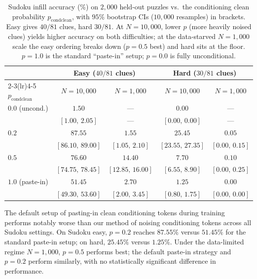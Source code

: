 \documentclass{article}
\begin{document}
\begin{table}[t]
\centering
\caption{Sudoku infill accuracy (\%) on $2{,}000$ held-out puzzles vs.\ the conditioning clean
probability $p_\text{condclean}$, with $95\%$ bootstrap CIs ($10{,}000$ resamples) in brackets.
Easy gives $40/81$ clues, hard $30/81$. At $N{=}10{,}000$, lower $p$ (more heavily noised clues)
yields higher accuracy on both difficulties; at the data-starved $N{=}1{,}000$ scale the easy
ordering breaks down ($p{=}0.5$ best) and hard sits at the floor. $p{=}1.0$ is the standard
``paste-in'' setup; $p{=}0.0$ is fully unconditional.}
\label{tab:sudoku}
\begin{tabular}{lcccc}
\toprule
& \multicolumn{2}{c}{Easy ($40/81$ clues)} & \multicolumn{2}{c}{Hard ($30/81$ clues)} \\
\cmidrule(lr){2-3}\cmidrule(lr){4-5}
$p_\text{condclean}$ & $N=10{,}000$ & $N=1{,}000$ & $N=10{,}000$ & $N=1{,}000$ \\
\midrule
$0.0$ (uncond.) & $1.50$ & --- & $0.00$ & --- \\
 & {\scriptsize $[1.00,\,2.05]$} & {\scriptsize ---} & {\scriptsize $[0.00,\,0.00]$} & {\scriptsize ---} \\
$0.2$ & $\mathbf{87.55}$ & $1.55$ & $\mathbf{25.45}$ & $0.05$ \\
 & {\scriptsize $[86.10,\,89.00]$} & {\scriptsize $[1.05,\,2.10]$} & {\scriptsize $[23.55,\,27.35]$} & {\scriptsize $[0.00,\,0.15]$} \\
$0.5$ & $76.60$ & $\mathbf{14.40}$ & $7.70$ & $\mathbf{0.10}$ \\
 & {\scriptsize $[74.75,\,78.45]$} & {\scriptsize $[12.85,\,16.00]$} & {\scriptsize $[6.55,\,8.90]$} & {\scriptsize $[0.00,\,0.25]$} \\
$1.0$ (paste-in) & $51.45$ & $2.70$ & $1.25$ & $0.00$ \\
 & {\scriptsize $[49.30,\,53.60]$} & {\scriptsize $[2.00,\,3.45]$} & {\scriptsize $[0.80,\,1.75]$} & {\scriptsize $[0.00,\,0.00]$} \\
\bottomrule
\end{tabular}
\end{table}

The default setup of pasting-in clean conditioning tokens during training performs 
notably worse than our method of noising conditioning tokens across all Sudoku settings. 
On Sudoku easy, $p{=}0.2$ reaches $87.55\%$ versus
$51.45\%$ for the standard paste-in setup; on hard, $25.45\%$ versus $1.25\%$. 
Under the data-limited regime $N=1{,}000$, $p{=}0.5$ performs best; 
the default paste-in strategy and $p{=}0.2$ perform similarly, with no statistically significant
difference in performance. 
\end{document}
